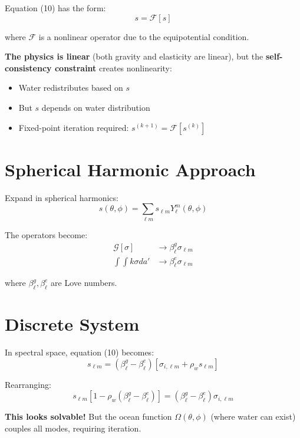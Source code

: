 \documentclass{article}
\begin{document}
Equation (10) has the form:
\begin{equation}
s = \mathcal{F}[s]
\end{equation}

where $\mathcal{F}$ is a nonlinear operator due to the equipotential condition.

\textbf{The physics is linear} (both gravity and elasticity are linear), but the \textbf{self-consistency constraint} creates nonlinearity:
\begin{itemize}
\item Water redistributes based on $s$
\item But $s$ depends on water distribution
\item Fixed-point iteration required: $s^{(k+1)} = \mathcal{F}[s^{(k)}]$
\end{itemize}

\section{Spherical Harmonic Approach}

Expand in spherical harmonics:
\begin{equation}
s(\theta,\phi) = \sum_{\ell m} s_{\ell m} Y_\ell^m(\theta,\phi)
\end{equation}

The operators become:
\begin{align}
\mathcal{G}[\sigma] &\rightarrow \beta_\ell^g \sigma_{\ell m} \\
\int\int k \sigma da' &\rightarrow \beta_\ell^e \sigma_{\ell m}
\end{align}

where $\beta_\ell^g, \beta_\ell^e$ are Love numbers.

\section{Discrete System}

In spectral space, equation (10) becomes:
\begin{equation}
s_{\ell m} = (\beta_\ell^g - \beta_\ell^e)[\sigma_{i,\ell m} + \rho_w s_{\ell m}]
\end{equation}

Rearranging:
\begin{equation}
s_{\ell m}[1 - \rho_w(\beta_\ell^g - \beta_\ell^e)] = (\beta_\ell^g - \beta_\ell^e)\sigma_{i,\ell m}
\end{equation}

\textbf{This looks solvable!} But the ocean function $\Omega(\theta,\phi)$ (where water can exist) couples all modes, requiring iteration.
\end{document}
